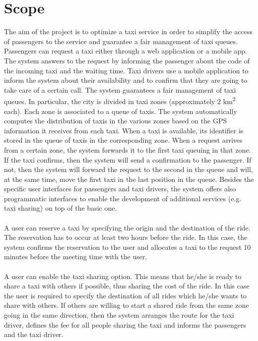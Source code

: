 \section{Scope}
The aim of the project is to optimize a taxi service in order to simplify the access of passengers to the service and guarantee a fair management of taxi queues. Passengers can request a taxi either through a web application or a mobile app. The system answers to the request by informing the passenger about the code of the incoming taxi and the waiting time. Taxi drivers use a mobile application to inform the system about their availability and to confirm that they are going to take care of a certain call. The system guarantees a fair management of taxi queues. In particular, the city is divided in taxi zones (approximately 2 km\textsuperscript{2} each). Each zone is associated to a queue of taxis. The system automatically computes the distribution of taxis in the various zones based on the GPS information it receives from each taxi. When a taxi is available, its identifier is stored in the queue of taxis in the corresponding zone. When a request arrives from a certain zone, the system forwards it to the first taxi queuing in that zone. If the taxi confirms, then the system will send a confirmation to the passenger. If not, then the system will forward the request to the second in the queue and will, at the same time, move the first taxi in the last position in the queue.
Besides the specific user interfaces for passengers and taxi drivers, the system offers also programmatic interfaces to enable the development of additional services (e.g. taxi sharing) on top of the basic one.
\\ \\
A user can reserve a taxi by specifying the origin and the destination of the ride. The reservation has to occur at least two hours before the ride. In this case, the system confirms the reservation to the user and allocates a taxi to the request 10 minutes before the meeting time with the user.
\\ \\
A user can enable the taxi sharing option. This means that he/she is ready to share a taxi with others if possible, thus sharing the cost of the ride. In this case the user is required to specify the destination of all rides which he/she wants to share with others. If others are willing to start a shared ride from the same zone going in the same direction, then the system arranges the route for the taxi driver, defines the fee for all people sharing the taxi and informs the passengers and the taxi driver.

